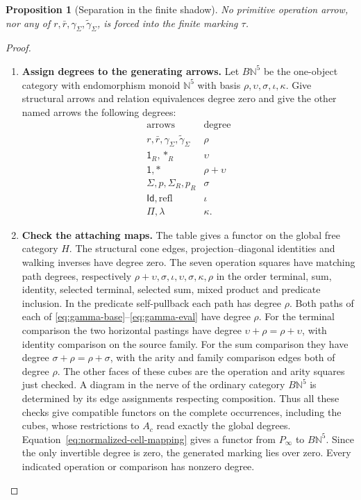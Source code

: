 \documentclass[oneside]{article}
\theoremstyle{plain}
\newtheorem{proposition}[theorem]{Proposition}
\theoremstyle{definition}
\theoremstyle{remark}
\begin{document}
\begin{proposition}[Separation in the finite shadow]
\label{prop:charge}
No primitive operation arrow, nor any of
$r,\bar r,\gamma_\Sigma,\widetilde\gamma_\Sigma$, is forced into the
finite marking $\tau$.
\end{proposition}
\begin{proof}
\leavevmode
\begin{enumerate}
\item \textbf{Assign degrees to the generating arrows.}
Let $B\mathbb N^5$ be the one-object category with endomorphism
monoid $\mathbb N^5$ with basis $\rho,\upsilon,\sigma,\iota,\kappa$.
Give structural arrows and relation equivalences degree zero and give
the other named arrows the following degrees:
\[
\begin{array}{c|c}
 \text{arrows}&\text{degree}\\\hline
 r,\bar r,\gamma_\Sigma,\widetilde\gamma_\Sigma&\rho\\
 \mathsf 1_R,*_R&\upsilon\\
 \mathsf 1,*&\rho+\upsilon\\
 \Sigma,p,\Sigma_R,p_R&\sigma\\
 \mathsf{Id},\mathrm{refl}&\iota\\
 \Pi,\lambda&\kappa.
\end{array}
\]

\item \textbf{Check the attaching maps.}
The table gives a functor on the global free category $H$.
The structural cone edges, projection--diagonal identities and
walking inverses have degree zero. The seven operation squares have
matching path degrees, respectively
$\rho+\upsilon,\sigma,\iota,\upsilon,\sigma,\kappa,\rho$
in the order terminal, sum, identity, selected terminal, selected
sum, mixed product and predicate inclusion. In the predicate
self-pullback each path has degree $\rho$. Both paths of each of
\eqref{eq:gamma-base}--\eqref{eq:gamma-eval} have degree $\rho$.
For the terminal comparison the two horizontal pastings have degree
$\upsilon+\rho=\rho+\upsilon$, with identity comparison on the
source family. For the sum comparison they have degree
$\sigma+\rho=\rho+\sigma$, with the arity and family comparison
edges both of degree $\rho$. The other faces of these cubes are
the operation and arity squares just checked. A diagram in the
nerve of the ordinary category $B\mathbb N^5$ is determined by its
edge assignments respecting composition. Thus all these checks give
compatible functors on the complete occurrences, including the
cubes, whose restrictions to $A_c$ read exactly the global degrees.
Equation~\eqref{eq:normalized-cell-mapping} gives a functor from
$P_\infty$ to $B\mathbb N^5$. Since the only invertible degree is
zero, the generated marking lies over zero. Every indicated operation
or comparison has nonzero degree.\qedhere

\end{enumerate}
\end{proof}
\end{document}
